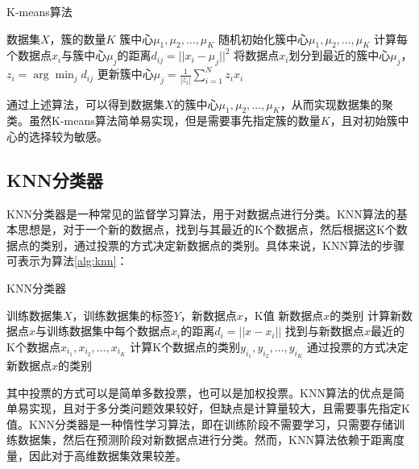 \begin{algorithm}[H]
    \caption{K-means算法}
    \label{alg:kmeans}
    \begin{algorithmic}[1] %
        \Require 数据集$X$，簇的数量$K$
        \Ensure 簇中心$\mu_1, \mu_2, \ldots, \mu_K$
        \State 随机初始化簇中心$\mu_1, \mu_2, \ldots, \mu_K$
            \State 计算每个数据点$x_i$与簇中心$\mu_j$的距离$d_{ij}=||x_i - \mu_j||^2$
            \State 将数据点$x_i$划分到最近的簇中心$\mu_j$，$z_i = \arg\min_j d_{ij}$
            \State 更新簇中心$\mu_j = \frac{1}{|z_i|} \sum_{i=1}^{N} z_i x_i$
        \EndWhile
    \end{algorithmic}
\end{algorithm}

通过上述算法，可以得到数据集$X$的簇中心$\mu_1, \mu_2, \ldots, \mu_K$，从而实现数据集的聚类。虽然K-means算法简单易实现，但是需要事先指定簇的数量$K$，且对初始簇中心的选择较为敏感。

\subsection{KNN分类器}

KNN分类器是一种常见的监督学习算法，用于对数据点进行分类。KNN算法的基本思想是，对于一个新的数据点，找到与其最近的K个数据点，然后根据这K个数据点的类别，通过投票的方式决定新数据点的类别。具体来说，KNN算法的步骤可表示为算法\ref{alg:knn}：

\begin{algorithm}[H]
    \caption{KNN分类器}
    \label{alg:knn}
    \begin{algorithmic}[1] %
        \Require 训练数据集$X$，训练数据集的标签$Y$，新数据点$x$，K值
        \Ensure 新数据点$x$的类别
        \State 计算新数据点$x$与训练数据集中每个数据点$x_i$的距离$d_i=||x - x_i||$
        \State 找到与新数据点$x$最近的K个数据点$x_{i_1}, x_{i_2}, \ldots, x_{i_K}$
        \State 计算K个数据点的类别$y_{i_1}, y_{i_2}, \ldots, y_{i_K}$
        \State 通过投票的方式决定新数据点$x$的类别
    \end{algorithmic}
\end{algorithm}

其中投票的方式可以是简单多数投票，也可以是加权投票。KNN算法的优点是简单易实现，且对于多分类问题效果较好，但缺点是计算量较大，且需要事先指定K值。KNN分类器是一种惰性学习算法，即在训练阶段不需要学习，只需要存储训练数据集，然后在预测阶段对新数据点进行分类。然而，KNN算法依赖于距离度量，因此对于高维数据集效果较差。

